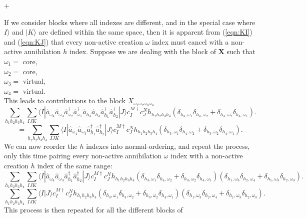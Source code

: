 +\documentclass[12pt]{article}
\begin{document}
\noindent If we consider blocks where all indexes are different, and in the
special case where $I\rangle$ and $|K\rangle$ are defined within the same
space, then it is apparent from (\ref{eqn:KI}) and  (\ref{eqn:KJ}) that every
non-active creation $\omega$ index must cancel with a non-active annihilation
$h$ index. Suppose we are dealing with the block of $\mathbf{X}$ such that \\
$\omega_{1} = $ core,\\  
$\omega_{2} = $ core,   \\
$\omega_{3} = $ virtual, \\
$\omega_{4} = $ virtual.\\ 
\noindent  This leads to contributions to the block $X_{\omega_{1}\omega_{2}\omega_{3}\omega_{4}}$ 
\begin{equation*}
\sum_{h_{1}h_{2}h_{3}h_{4}} 
\sum_{IJK}
\langle I |
\hat{a}_{\omega_{4}} \hat{a}_{\omega_{3}}\hat{a}^{\dagger}_{\omega_{2}}\hat{a}^{\dagger}_{\omega_{1}}
\hat{a}_{h_{3}}\hat{a}_{h_{4}}\hat{a}^{\dagger}_{h_{1}} \hat{a}^{\dagger}_{h_{2}}| J \rangle  
c^{M \dagger}_{I}c^{N}_{J} h_{h_{1}h_{2}h_{3}h_{4}}( \delta_{h_{3},\omega_{1}}\delta_{h_{4},\omega_{2}} +  \delta_{h_{3},\omega_{2}}\delta_{h_{4},\omega_{1}} ).
\end{equation*}
\begin{equation}
=\sum_{h_{1}h_{2}h_{3}h_{4}} 
\sum_{IJK}
\langle I |
\hat{a}_{\omega_{4}} \hat{a}_{\omega_{3}}\hat{a}^{\dagger}_{h_{1}} \hat{a}^{\dagger}_{h_{2}}| J \rangle  
c^{M \dagger}_{I}c^{N}_{J} h_{h_{1}h_{2}h_{3}h_{4}}( \delta_{h_{3},\omega_{1}}\delta_{h_{4},\omega_{2}} +  \delta_{h_{3},\omega_{2}}\delta_{h_{4},\omega_{1}} ).
\label{eqn:XRIHmatch}
\end{equation}
\noindent We can now reorder the $h$ indexes into normal-ordering, and repeat
the process, only this time pairing every non-active annihilation $\omega$
index with a non-active creation $h$ index of the same range:
\begin{equation*}
\sum_{h_{1}h_{2}h_{3}h_{4}} 
\sum_{IJK}
\langle I |
\hat{a}_{\omega_{4}} \hat{a}_{\omega_{3}}\hat{a}^{\dagger}_{h_{1}} \hat{a}^{\dagger}_{h_{2}}| J \rangle  
c^{M \dagger}_{I}c^{N}_{J} h_{h_{1}h_{2}h_{3}h_{4}}
( \delta_{h_{3},\omega_{1}}\delta_{h_{4},\omega_{2}} +  \delta_{h_{3},\omega_{2}}\delta_{h_{4},\omega_{1}} )
( \delta_{h_{1},\omega_{3}}\delta_{h_{2},\omega_{4}} +  \delta_{h_{1},\omega_{3}}\delta_{h_{2},\omega_{3}} ).
\end{equation*}
\begin{equation}
\sum_{h_{1}h_{2}h_{3}h_{4}} 
\sum_{IJK}
\langle I|J\rangle c^{M \dagger}_{I}
c^{N}_{J} h_{h_{1}h_{2}h_{3}h_{4}}
( \delta_{h_{3},\omega_{1}}\delta_{h_{4},\omega_{2}} +  \delta_{h_{3},\omega_{2}}\delta_{h_{4},\omega_{1}} )
( \delta_{h_{1},\omega_{3}}\delta_{h_{2},\omega_{4}} +  \delta_{h_{1},\omega_{3}}\delta_{h_{2},\omega_{3}} ).
\label{eqn:XRIHmatch2}
\end{equation} This process is then repeated for all the different blocks  of
\end{document}
